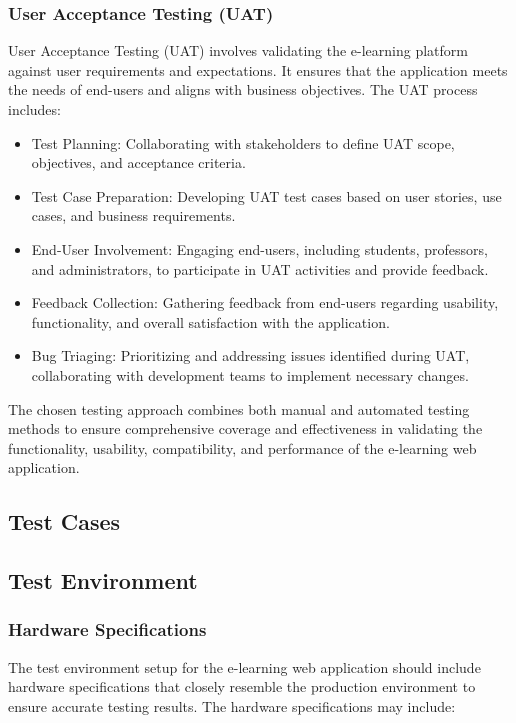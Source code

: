 		\subsubsection{User Acceptance Testing (UAT)}
		
		User Acceptance Testing (UAT) involves validating the e-learning platform against user requirements and expectations. It ensures that the application meets the needs of end-users and aligns with business objectives. The UAT process includes:
		
		\begin{itemize}
			\item Test Planning: Collaborating with stakeholders to define UAT scope, objectives, and acceptance criteria.
			\item Test Case Preparation: Developing UAT test cases based on user stories, use cases, and business requirements.
			\item End-User Involvement: Engaging end-users, including students, professors, and administrators, to participate in UAT activities and provide feedback.
			\item Feedback Collection: Gathering feedback from end-users regarding usability, functionality, and overall satisfaction with the application.
			\item Bug Triaging: Prioritizing and addressing issues identified during UAT, collaborating with development teams to implement necessary changes.
		\end{itemize}
		
		The chosen testing approach combines both manual and automated testing methods to ensure comprehensive coverage and effectiveness in validating the functionality, usability, compatibility, and performance of the e-learning web application.
		
	\subsection{Test Cases}
	
	\subsection{Test Environment}
	
		\subsubsection{Hardware Specifications}
		
		The test environment setup for the e-learning web application should include hardware specifications that closely resemble the production environment to ensure accurate testing results. The hardware specifications may include:
		

